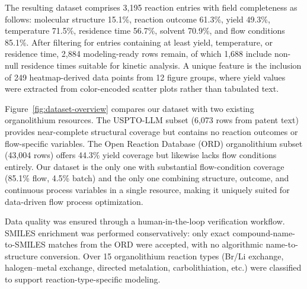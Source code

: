 \documentclass[journal=jcisd8,manuscript=article]{achemso}
\begin{document}
The resulting dataset comprises 3{,}195 reaction entries with field completeness as follows: molecular structure 15.1\%, reaction outcome 61.3\%, yield 49.3\%, temperature 71.5\%, residence time 56.7\%, solvent 70.9\%, and flow conditions 85.1\%.
After filtering for entries containing at least yield, temperature, or residence time, 2{,}884 modeling-ready rows remain, of which 1{,}688 include non-null residence times suitable for kinetic analysis.
A unique feature is the inclusion of 249 heatmap-derived data points from 12 figure groups, where yield values were extracted from color-encoded scatter plots rather than tabulated text.

Figure~\ref{fig:dataset-overview} compares our dataset with two existing organolithium resources.
The USPTO-LLM subset (6{,}073 rows from patent text) provides near-complete structural coverage but contains no reaction outcomes or flow-specific variables.
The Open Reaction Database (ORD) organolithium subset (43{,}004 rows) offers 44.3\% yield coverage but likewise lacks flow conditions entirely.
Our dataset is the only one with substantial flow-condition coverage (85.1\% flow, 4.5\% batch) and the only one combining structure, outcome, and continuous process variables in a single resource, making it uniquely suited for data-driven flow process optimization.

Data quality was ensured through a human-in-the-loop verification workflow.
SMILES enrichment was performed conservatively: only exact compound-name-to-SMILES matches from the ORD were accepted, with no algorithmic name-to-structure conversion.
Over 15 organolithium reaction types (Br/Li exchange, halogen--metal exchange, directed metalation, carbolithiation, etc.) were classified to support reaction-type-specific modeling.

\end{document}
